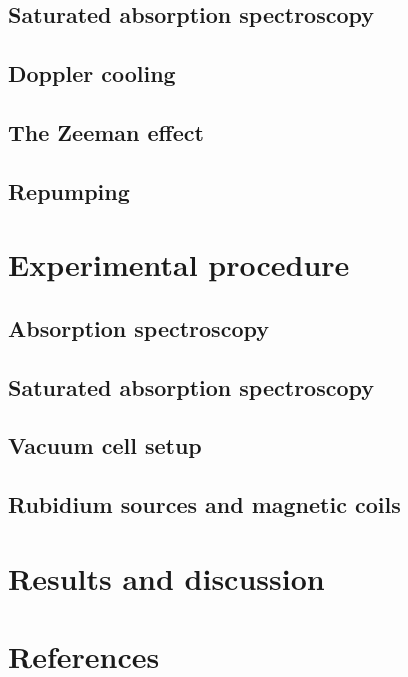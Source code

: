 \documentclass[11pt,twoside,a4paper]{article}
\begin{document}
\subsection{Saturated absorption spectroscopy}
\subsection{Doppler cooling}
\subsection{The Zeeman effect}
\subsection{Repumping}
\section{Experimental procedure}
\subsection{Absorption spectroscopy}
\subsection{Saturated absorption spectroscopy}
\subsection{Vacuum cell setup}
\subsection{Rubidium sources and magnetic coils}
\section{Results and discussion}
\section{References}


\end{document}
